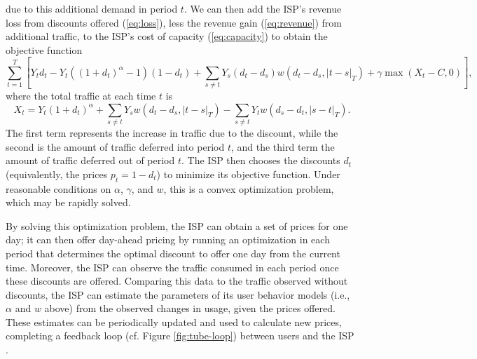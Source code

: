 due to this additional demand in period $t$. We can then add the ISP's revenue loss from discounts offered (\ref{eq:loss}), less the revenue gain (\ref{eq:revenue}) from additional traffic, to the ISP's cost of capacity (\ref{eq:capacity}) to obtain the objective function
\begin{equation*}
\sum_{t = 1}^T \left[Y_td_t - Y_t\left(\left(1 + d_t\right)^\alpha - 1\right)(1 - d_t) + \sum_{s\neq t} Y_s\left(d_t - d_s\right)w\left(d_t - d_s, \left|t - s\right|_T\right) + \gamma\max\left(X_t - C,0\right)\right],
\end{equation*}
where the total traffic at each time $t$ is
\begin{equation*}
X_t = Y_t\left(1 + d_t\right)^\alpha + \sum_{s\neq t} Y_s w\left(d_t - d_s, \left|t - s\right|_T\right) - \sum_{s\neq t} Y_t w\left(d_s - d_t, \left|s - t\right|_T\right).
\end{equation*}
The first term represents the increase in traffic due to the discount, while the second is the amount of traffic deferred into period $t$, and the third term the amount of traffic deferred out of period $t$. The ISP then chooses the discounts $d_t$ (equivalently, the prices $p_t = 1 - d_t$) to minimize its objective function. Under reasonable conditions on $\alpha$, $\gamma$, and $w$, this is a convex optimization problem, which may be rapidly solved.

By solving this optimization problem, the ISP can obtain a set of prices for one day; it can then offer day-ahead pricing by running an optimization in each period that determines the optimal discount to offer one day from the current time. Moreover, the ISP can observe the traffic consumed in each period once these discounts are offered. Comparing this data to the traffic observed without discounts, the ISP can estimate the parameters of its user behavior models (i.e., $\alpha$ and $w$ above) from the observed changes in usage, given the prices offered. These estimates can be periodically updated and used to calculate new prices, completing a feedback loop (cf. Figure \ref{fig:tube-loop}) between users and the ISP \cite{ha2012tube}. 